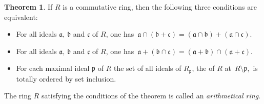 \documentclass[12pt]{article}
\theoremstyle{definition}
\newtheorem*{thmplain}{Theorem}
\begin{document}
\begin{thmplain}
If $R$ is a commutative ring, then the following three conditions are equivalent:
\begin{itemize}
 \item For all ideals $\mathfrak{a}$, $\mathfrak{b}$ and $\mathfrak{c}$ of $R$, one has\, $\mathfrak{a\cap(b+c) = (a\cap b)+(a\cap c)}$.
 \item For all ideals $\mathfrak{a}$, $\mathfrak{b}$ and $\mathfrak{c}$ of $R$, one has\, $\mathfrak{a+(b\cap c) = (a+b)\cap(a+c)}$.
 \item For each maximal ideal $\mathfrak{p}$ of $R$ the set of all ideals of $R_{\mathfrak{p}}$, the  of $R$ at\, $R\!\setminus\!\mathfrak{p}$,\, is totally ordered by set inclusion.
\end{itemize}
\end{thmplain}

The ring $R$ satisfying the conditions of the theorem is called an {\em arithmetical ring}.
\end{document}
